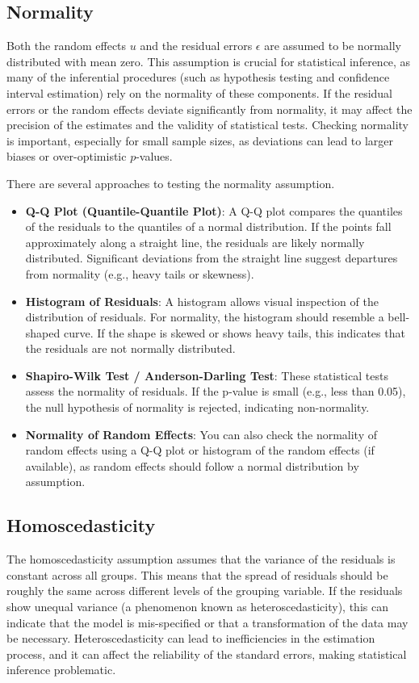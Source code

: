 \subsection*{Normality}
Both the random effects $u$ and the residual errors $\epsilon$ are assumed to be normally distributed with mean zero. This assumption is crucial for statistical inference, as many of the inferential procedures (such as hypothesis testing and confidence interval estimation) rely on the normality of these components. If the residual errors or the random effects deviate significantly from normality, it may affect the precision of the estimates and the validity of statistical tests. Checking normality is important, especially for small sample sizes, as deviations can lead to larger biases or over-optimistic $p$-values.

There are several approaches to testing the normality assumption.
\begin{itemize}
\item \textbf{Q-Q Plot (Quantile-Quantile Plot)}: A Q-Q plot compares the quantiles of the residuals to the quantiles of a normal distribution. If the points fall approximately along a straight line, the residuals are likely normally distributed. Significant deviations from the straight line suggest departures from normality (e.g., heavy tails or skewness).

\item \textbf{Histogram of Residuals}: A histogram allows visual inspection of the distribution of residuals. For normality, the histogram should resemble a bell-shaped curve. If the shape is skewed or shows heavy tails, this indicates that the residuals are not normally distributed.

\item \textbf{Shapiro-Wilk Test / Anderson-Darling Test}: These statistical tests assess the normality of residuals. If the p-value is small (e.g., less than 0.05), the null hypothesis of normality is rejected, indicating non-normality.

\item \textbf{Normality of Random Effects}: You can also check the normality of random effects using a Q-Q plot or histogram of the random effects (if available), as random effects should follow a normal distribution by assumption.
\end{itemize}

\subsection*{Homoscedasticity}
The homoscedasticity assumption assumes that the variance of the residuals is constant across all groups. This means that the spread of residuals should be roughly the same across different levels of the grouping variable. If the residuals show unequal variance (a phenomenon known as heteroscedasticity), this can indicate that the model is mis-specified or that a transformation of the data may be necessary. Heteroscedasticity can lead to inefficiencies in the estimation process, and it can affect the reliability of the standard errors, making statistical inference problematic.

